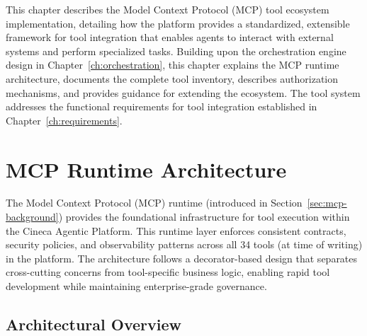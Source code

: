 \documentclass[a4paper,twoside]{sapthesis}
\begin{document}
%

This chapter describes the Model Context Protocol (MCP) tool ecosystem implementation, detailing how the platform provides a standardized, extensible framework for tool integration that enables agents to interact with external systems and perform specialized tasks. Building upon the orchestration engine design in Chapter~\ref{ch:orchestration}, this chapter explains the MCP runtime architecture, documents the complete tool inventory, describes authorization mechanisms, and provides guidance for extending the ecosystem. The tool system addresses the functional requirements for tool integration established in Chapter~\ref{ch:requirements}.

\section{MCP Runtime Architecture}
\label{sec:mcp-runtime}

The Model Context Protocol (MCP) runtime (introduced in Section~\ref{sec:mcp-background}) provides the foundational infrastructure for tool execution within the Cineca Agentic Platform. This runtime layer enforces consistent contracts, security policies, and observability patterns across all 34 tools (at time of writing) in the platform. The architecture follows a decorator-based design that separates cross-cutting concerns from tool-specific business logic, enabling rapid tool development while maintaining enterprise-grade governance.

\subsection{Architectural Overview}
\label{subsec:mcp-runtime-overview}
\end{document}
